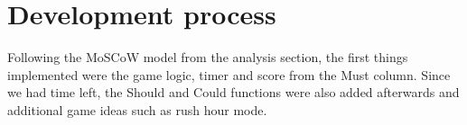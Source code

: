 \section{Development process}
Following the MoSCoW model from the analysis section, the first things implemented were the game logic, timer and score from the Must column. Since we had time left, the Should and Could functions were also added afterwards and additional game ideas such as rush hour mode.